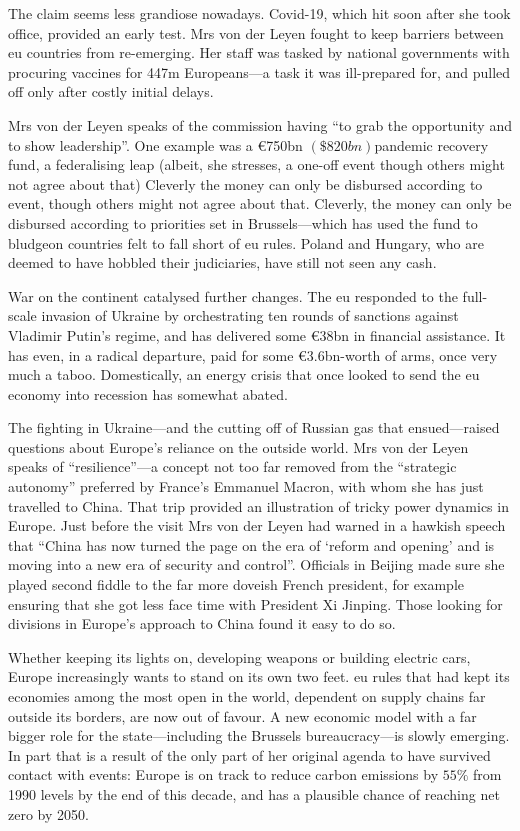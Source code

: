 \documentclass[10pt, a4paper, oneside]{article}
\begin{document}
\begin{spacing}{2.0}
The claim seems less grandiose nowadays. Covid-19, which hit soon after she took office, provided an early
test. Mrs von der Leyen fought to keep barriers between eu countries from re-emerging. Her staff was tasked by national 
governments with procuring vaccines for 447m Europeans—a task it was ill-prepared for, and pulled off only after costly initial delays.

Mrs von der Leyen speaks of the commission having “to grab the opportunity and to show leadership”. One
example was a €750bn $(\$820bn) $pandemic recovery fund, a federalising leap (albeit, she stresses, a one-off
event though others might not agree about that) Cleverly the money can only be disbursed according to
event, though others might not agree about that. Cleverly, the money can only be disbursed according to
priorities set in Brussels—which has used the fund to bludgeon countries felt to fall short of eu rules.
Poland and Hungary, who are deemed to have hobbled their judiciaries, have still not seen any cash.

War on the continent catalysed further changes. The eu responded to the full-scale invasion of Ukraine by
orchestrating ten rounds of sanctions against Vladimir Putin's regime, and has delivered some €38bn in
financial assistance. It has even, in a radical departure, paid for some €3.6bn-worth of arms, once very much a taboo. 
Domestically, an energy crisis that once looked to send the eu economy into recession has
somewhat abated. 

The fighting in Ukraine—and the cutting off of Russian gas that ensued—raised questions about Europe's reliance on the outside world. 
Mrs von der Leyen speaks of “resilience”—a concept not too far removed from the “strategic autonomy” preferred by France's Emmanuel Macron, 
with whom she has just travelled to China. That trip provided an illustration of tricky power dynamics in Europe. Just before the visit Mrs 
von der Leyen had warned in a hawkish speech that “China has now turned the page on the era of ‘reform and opening' and is moving into a 
new era of security and control”. Officials in Beijing made sure she played second fiddle to the far more doveish French president, 
for example ensuring that she got less face time with President Xi Jinping. Those looking for divisions in Europe's approach to China 
found it easy to do so. 

Whether keeping its lights on, developing weapons or building electric cars, Europe increasingly wants to stand on its own two feet. 
eu rules that had kept its economies among the most open in the world, dependent on supply chains far outside its borders, are now out 
of favour. A new economic model with a far bigger role for the state—including the Brussels bureaucracy—is slowly emerging. 
In part that is a result of the only part of her original agenda to have survived contact with events: Europe is on track to reduce 
carbon emissions by $55\%$ from 1990 levels by the end of this decade, and has a plausible chance of reaching net zero by 2050.




\end{spacing}
\end{document}
